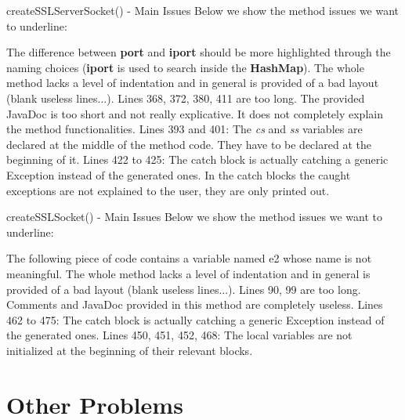 \documentclass{../common/latex_classes/pdf_presentation}
\begin{document}
	\begin{frame}{createSSLServerSocket() - Main Issues}
		Below we show the method issues we want to underline:
		\begin{itemize}
			 The difference between \textbf{port} and \textbf{iport} should be more highlighted through the naming choices (\textbf{iport} is used to search inside the \textbf{HashMap}).%
			 The whole method lacks a level of indentation and in general is provided of a bad layout (blank useless lines...).
			 Lines 368, 372, 380, 411 are too long.
			 The provided JavaDoc is too short and not really explicative. It does not completely explain the method functionalities.
			 Lines 393 and 401: The \textit{cs} and \textit{ss} variables are declared at the middle of the method code. They have to be declared at the beginning of it.
			 Lines 422 to 425: The catch block is actually catching a generic Exception instead of the generated ones.
			 In the catch blocks the caught exceptions are not explained to the user, they are only printed out.
		\end{itemize}
	\end{frame}
	
	\begin{frame}{createSSLSocket() - Main Issues}
		Below we show the method issues we want to underline:
		\begin{itemize}
			 The following piece of code contains a variable named e2 whose name is not meaningful.%
			 The whole method 	lacks a level of indentation and in general is provided of a bad layout (blank useless lines...).
			 Lines 90, 99 are too long.
			 Comments and JavaDoc provided in this method are completely useless.
			 Lines 462 to 475: The catch block is actually catching a generic Exception instead of the generated ones.
			 Lines 450, 451, 452, 468: The local variables are not initialized at the beginning of their relevant blocks.
		\end{itemize}
	\end{frame}
	
	\section{Other Problems}
	
\end{document}
